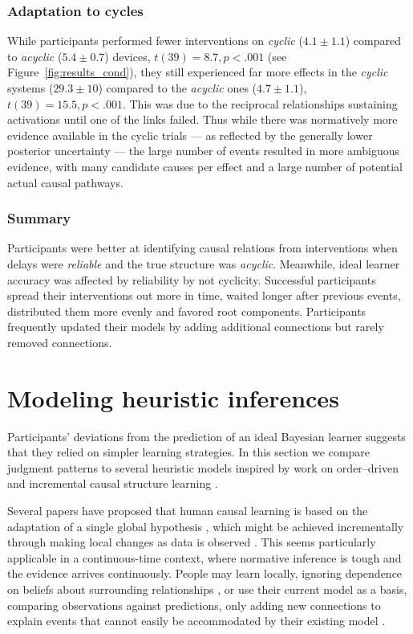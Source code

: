 \documentclass[10pt,letterpaper]{article}
\begin{document}
\subsubsection{Adaptation to cycles}

While participants performed fewer interventions on  \emph{cyclic} ($4.1\pm1.1$) compared to \emph{acyclic} ($5.4\pm0.7$) devices, $t(39) = 8.7, p <.001$ (see Figure~\ref{fig:results_cond}), they still experienced far more effects in the \emph{cyclic} systems ($29.3\pm10$) compared to the \emph{acyclic} ones ($4.7\pm1.1$), $t(39) = 15.5, p<.001$.  This was due to the reciprocal relationships sustaining activations until one of the links failed.  Thus while there was normatively more evidence available in the cyclic trials --- as reflected by the generally lower posterior uncertainty --- the large number of events resulted in more ambiguous evidence, with many candidate causes per effect and a large number of potential actual causal pathways.

\subsubsection{Summary}

Participants were better at identifying causal relations from interventions when delays were \emph{reliable} and the true structure was \emph{acyclic}.  Meanwhile, ideal learner accuracy was affected by reliability by not cyclicity.
Successful participants spread their interventions out more in time, waited longer after previous events, distributed them more evenly and favored root components.    
Participants frequently updated their models by adding additional connections but rarely removed connections.


\section{Modeling heuristic inferences}

Participants' deviations from the prediction of an ideal Bayesian learner suggests that they relied on simpler learning strategies. In this section we compare judgment patterns to several heuristic models inspired by work on order--driven \citep[e.g.,][]{bramley2014order} and incremental causal structure learning \citep[e.g.,][]{bonawitz2014win, bramley2017neurath}.

Several papers have proposed that human causal learning is based on the adaptation of a single global hypothesis \citep{bonawitz2014win}, which might be achieved incrementally through making local changes as data is observed \citep{bramley2017neurath}. This seems particularly applicable in a continuous-time context, where normative inference is tough and the evidence arrives continuously.  People may learn locally, ignoring dependence on beliefs about surrounding relationships \citep[e.g.][]{fernbach2009causal}, or use their current model as a basis, comparing observations against predictions, only adding new connections to explain events that cannot easily be accommodated by their existing model \citep{bramley2017neurath}.
\end{document}
